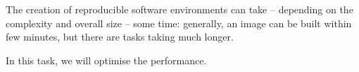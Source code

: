\begin{task}[
  title=Performance optimisation,
  id=performance-optimisation,
  lead=QS,
  PM=9,
  partners={SRL}
]
  The creation of reproducible software environments can take -- depending on
  the complexity and overall size -- some time: generally, an image can be built
  within few minutes, but there are tasks taking much longer.

  In this task, we will optimise the \repotodocker{} performance.


\end{task}
